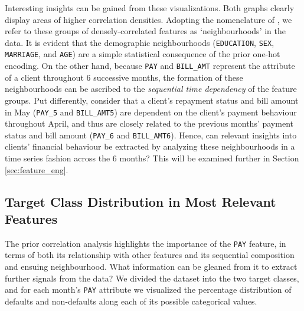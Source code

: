 \documentclass{article}
\newcommand{\code}{\texttt}
\begin{document}
Interesting insights can be gained from these visualizations. Both graphs clearly display areas of higher correlation densities. Adopting the nomenclature of \citet{hu2019feature}, we refer to these groups of densely-correlated features as `neighbourhoods' in the data. It is evident that the demographic neighbourhoods (\code{EDUCATION}, \code{SEX}, \code{MARRIAGE}, and \code{AGE}) are a simple statistical consequence of the prior one-hot encoding. On the other hand, because \code{PAY} and \code{BILL\_AMT} represent the attribute of a client throughout 6 successive months, the formation of these neighbourhoods can be ascribed to the \textit{sequential time dependency} of the feature groups. Put differently, consider that a client's repayment status and bill amount in May (\code{PAY\_5} and \code{BILL\_AMT5}) are dependent on the client's payment behaviour throughout April, and thus are closely related to the previous months' payment status and bill amount (\code{PAY\_6} and \code{BILL\_AMT6}). Hence, can relevant insights into clients' financial behaviour be extracted by analyzing these neighbourhoods in a time series fashion across the 6 months? This will be examined further in Section \ref{sec:feature_eng}.

\subsection{Target Class Distribution in Most Relevant Features}
\label{sec:target_class_dist}

The prior correlation analysis highlights the importance of the \code{PAY} feature, in terms of both its relationship with other features and its sequential composition and ensuing neighbourhood. What information can be gleaned from it to extract further signals from the data? We divided the dataset into the two target classes, and for each month’s \code{PAY} attribute we visualized the percentage distribution of defaults and non-defaults along each of its possible categorical values.
\end{document}
